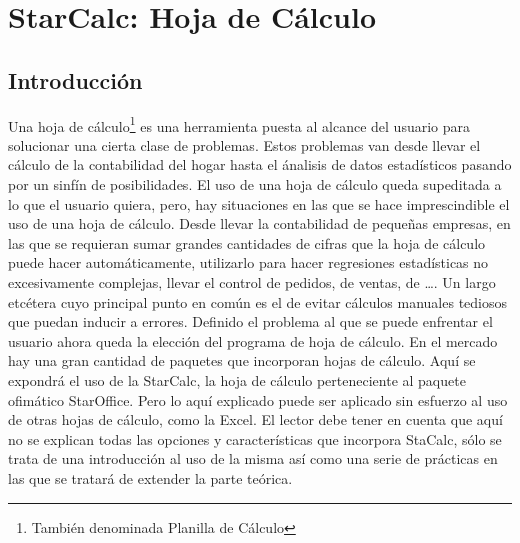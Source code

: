 
% 


\section{StarCalc: Hoja de Cálculo}




\subsection{Introducción}

Una hoja de cálculo\footnote{También denominada Planilla de Cálculo} es una
herramienta puesta al alcance del usuario para solucionar una cierta clase
de problemas. Estos problemas van desde llevar el cálculo de la contabilidad
del hogar hasta el ánalisis de datos estadísticos pasando por un sinfín de
posibilidades.
El uso de una hoja de cálculo queda supeditada a lo que el usuario quiera,
pero, hay situaciones en las que se hace imprescindible el uso de una hoja de
cálculo. Desde llevar la contabilidad de pequeñas empresas, en las que se
requieran sumar grandes cantidades de cifras que la hoja de cálculo puede
hacer automáticamente, utilizarlo para hacer regresiones estadísticas no
excesivamente complejas, llevar el control de pedidos, de ventas, de \ldots{}.
Un largo etcétera cuyo principal punto en común es el de evitar cálculos
manuales tediosos que puedan inducir a errores.
Definido el problema al que se puede enfrentar el usuario ahora queda la
elección del programa de hoja de cálculo. En el mercado hay una gran cantidad
de paquetes que incorporan hojas de cálculo. Aquí se expondrá el uso de la
StarCalc, la hoja de cálculo perteneciente al paquete ofimático StarOffice.
Pero lo aquí explicado puede ser aplicado sin esfuerzo al uso de otras hojas
de cálculo, como la Excel.
El lector debe tener en cuenta que aquí no se explican todas las opciones  y
características que incorpora StaCalc, sólo se trata de una introducción  al
uso de la misma así como una serie de prácticas en las que se tratará de
extender la parte teórica.

